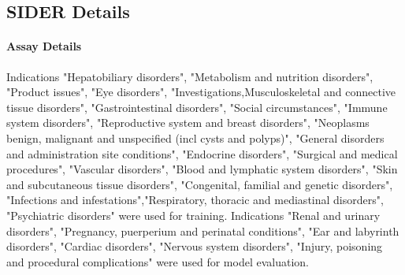 \subsection{SIDER Details}
\paragraph{Assay Details}
Indications "Hepatobiliary disorders", "Metabolism and nutrition disorders", "Product issues", "Eye disorders", "Investigations,Musculoskeletal and connective tissue disorders", "Gastrointestinal disorders", "Social circumstances", "Immune system disorders", "Reproductive system and breast disorders", "Neoplasms benign, malignant and unspecified (incl cysts and polyps)", "General disorders and administration site conditions", "Endocrine disorders", "Surgical and medical procedures", "Vascular disorders", "Blood and lymphatic system disorders", "Skin and subcutaneous tissue disorders", "Congenital, familial and genetic disorders", "Infections and infestations","Respiratory, thoracic and mediastinal disorders", "Psychiatric disorders" were used for training. Indications "Renal and urinary disorders", "Pregnancy, puerperium and perinatal conditions", "Ear and labyrinth disorders", "Cardiac disorders", "Nervous system disorders", "Injury, poisoning and procedural complications" were used for model evaluation.

